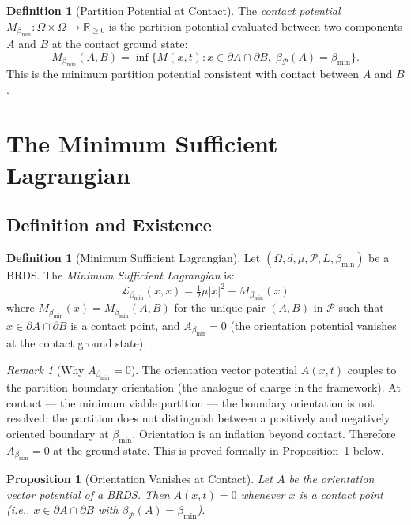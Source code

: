 \documentclass[12pt, a4paper]{article}
\theoremstyle{plain}
\newtheorem{proposition}[theorem]{Proposition}
\theoremstyle{definition}
\newtheorem{definition}[theorem]{Definition}
\theoremstyle{remark}
\newtheorem{remark}[theorem]{Remark}
\newcommand{\bmin}{\beta_{\min}}
\newcommand{\Lmin}{\mathcal{L}_{\bmin}}
\newcommand{\reals}{\mathbb{R}}
\newcommand{\Pcal}{\mathcal{P}}
\newcommand{\half}{\tfrac{1}{2}}
\begin{document}
\begin{definition}[Partition Potential at Contact]
\label{def:contactpotential}
The \emph{contact potential} $M_{\bmin}: \Omega \times \Omega \to \reals_{\geq 0}$
is the partition potential evaluated between two components $A$ and $B$ at the
contact ground state:
\[
  M_{\bmin}(A, B) = \inf\bigl\{M(x,t) : x \in \partial A \cap \partial B,\;
  \beta_\Pcal(A) = \bmin\bigr\}.
\]
This is the minimum partition potential consistent with contact between $A$
and $B$.
\end{definition}

\section{The Minimum Sufficient Lagrangian}
\label{sec:msl}

\subsection{Definition and Existence}

\begin{definition}[Minimum Sufficient Lagrangian]
\label{def:msl}
Let $(\Omega, d, \mu, \Pcal, L, \bmin)$ be a BRDS. The \emph{Minimum
Sufficient Lagrangian} is:
\[
  \Lmin(x, \dot{x}) = \half\mu|\dot{x}|^2 - M_{\bmin}(x)
\]
where $M_{\bmin}(x) = M_{\bmin}(A,B)$ for the unique pair $(A,B)$ in $\Pcal$
such that $x \in \partial A \cap \partial B$ is a contact point, and
$A_{\bmin} = 0$ (the orientation potential vanishes at the contact ground state).
\end{definition}

\begin{remark}[Why $A_{\bmin} = 0$]
\label{rem:novector}
The orientation vector potential $A(x,t)$ couples to the partition boundary
orientation (the analogue of charge in the framework). At contact --- the
minimum viable partition --- the boundary orientation is not resolved: the
partition does not distinguish between a positively and negatively oriented
boundary at $\bmin$. Orientation is an inflation beyond contact. Therefore
$A_{\bmin} = 0$ at the ground state. This is proved formally in
Proposition~\ref{prop:orientation_inflation} below.
\end{remark}

\begin{proposition}[Orientation Vanishes at Contact]
\label{prop:orientation_inflation}
Let $A$ be the orientation vector potential of a BRDS. Then $A(x,t) = 0$
whenever $x$ is a contact point (i.e., $x \in \partial A \cap \partial B$ with
$\beta_\Pcal(A) = \bmin$).
\end{proposition}
\end{document}
